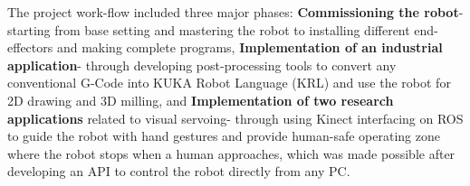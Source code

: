 The project work-flow included three major phases: \textbf{Commissioning the robot}- starting from base setting and mastering the robot to installing different end-effectors and making complete programs,  \textbf{Implementation of an industrial application}- through developing post-processing tools to convert any conventional G-Code into KUKA Robot Language (KRL) and use the robot for 2D drawing and 3D milling, and \textbf{ Implementation of two research applications} related to visual servoing- through using Kinect interfacing on ROS to guide the robot with hand gestures and provide human-safe operating zone where the robot stops when a human approaches, which was made possible after developing an API to control the robot directly from any PC.